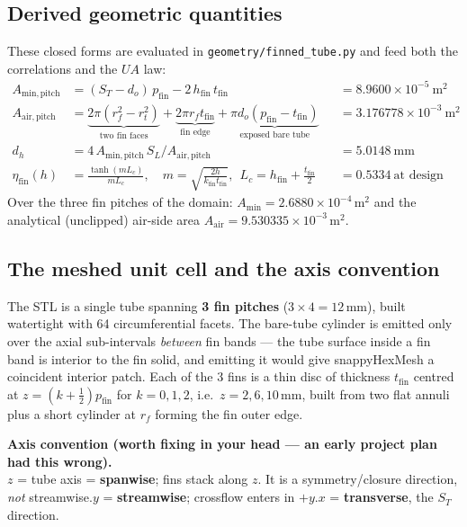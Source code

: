 \documentclass[11pt]{article}
\newcommand{\file}[1]{\texttt{\small #1}}
\newcommand{\keybox}[2]{%
  \begin{center}\colorbox{boxbg}{\begin{minipage}{0.94\linewidth}\vspace{3pt}
  \textbf{#1}\\[2pt]#2\vspace{3pt}\end{minipage}}\end{center}}
\begin{document}
\subsection{Derived geometric quantities}

These closed forms are evaluated in \file{geometry/finned\_tube.py} and feed both the correlations and the
$UA$ law:
\begin{align}
A_\mathrm{min,pitch} &= (S_T - d_o)\,p_\mathrm{fin} - 2\,h_\mathrm{fin}\,t_\mathrm{fin}
  &&= 8.9600\times10^{-5}\ \mathrm{m^2}\\
A_\mathrm{air,pitch} &= \underbrace{2\pi(r_f^2-r_t^2)}_{\text{two fin faces}}
  + \underbrace{2\pi r_f t_\mathrm{fin}}_{\text{fin edge}}
  + \underbrace{\pi d_o (p_\mathrm{fin}-t_\mathrm{fin})}_{\text{exposed bare tube}}
  &&= 3.176778\times10^{-3}\ \mathrm{m^2}\\
d_h &= 4\,A_\mathrm{min,pitch}\,S_L / A_\mathrm{air,pitch} &&= 5.0148\ \mathrm{mm}\\
\eta_\mathrm{fin}(h) &= \frac{\tanh(mL_c)}{mL_c},\quad
  m=\sqrt{\frac{2h}{k_\mathrm{fin}t_\mathrm{fin}}},\ \ L_c = h_\mathrm{fin}+\tfrac{t_\mathrm{fin}}{2}
  &&= 0.5334 \ \text{at design}
\label{eq:finef}
\end{align}
Over the three fin pitches of the domain: $A_\mathrm{min} = 2.6880\times10^{-4}$\,m$^2$ and the analytical
(unclipped) air-side area $A_\mathrm{air} = 9.530335\times10^{-3}$\,m$^2$.

\subsection{The meshed unit cell and the axis convention}

The STL is a single tube spanning \textbf{3 fin pitches} ($3\times4 = 12$\,mm), built watertight with 64
circumferential facets. The bare-tube cylinder is emitted only over the axial sub-intervals \emph{between} fin
bands --- the tube surface inside a fin band is interior to the fin solid, and emitting it would give
snappyHexMesh a coincident interior patch. Each of the 3 fins is a thin disc of thickness $t_\mathrm{fin}$
centred at $z = (k+\tfrac12)p_\mathrm{fin}$ for $k=0,1,2$, i.e.\ $z = 2, 6, 10$\,mm, built from two flat
annuli plus a short cylinder at $r_f$ forming the fin outer edge.

\keybox{Axis convention (worth fixing in your head --- an early project plan had this wrong).}{
$z$ = tube axis = \textbf{spanwise}; fins stack along $z$. It is a symmetry/closure direction, \emph{not}
streamwise.\quad $y$ = \textbf{streamwise}; crossflow enters in $+y$.\quad $x$ = \textbf{transverse}, the
$S_T$ direction.}
\end{document}

